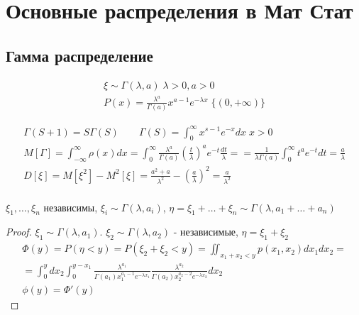 \documentclass{article}
\begin{document}
\section{Основные распределения в Мат Стат}
\subsection{Гамма распределение}
\begin{gather*}
  \xi \sim \Gamma(\lambda,a) \; \lambda>0,a>0 \\
  P(x)=\frac{\lambda^{a}}{\Gamma(a)}x^{a-1}e^{-\lambda x} \; \{(0,+\infty)\}
\end{gather*}

\begin{gather*}
  \Gamma(S+1)=S \Gamma(S) \qquad \Gamma(S)= \int_{0}^{\infty}x^{s-1}e^{-x}dx \; x>0 \\
  M[ \Gamma]=\int_{-\infty}^{\infty} \rho(x)dx= \int_{0}^{\infty}\frac{\lambda^{a}}{ \Gamma(a)}(\frac{t}{\lambda})^{a}e^{-t}\frac{dt}{\lambda}=
  =\frac{1}{\lambda \Gamma(a)}\int_{0}^{\infty}t^{a}e^{-t}dt=\frac{a}{\lambda} \\
  D[\xi]=M[\xi^{2}]-M^{2}[\xi]=\frac{a^2+a}{\lambda^2}-(\frac{a}{\lambda})^2=\frac{a}{\lambda^2} \\
\end{gather*}
\begin{theorem}
$\xi_1,\dots,\xi_n$ независимы, $\xi_i \sim \Gamma(\lambda,a_i)$, $\eta=\xi_1+\dots+\xi_n \sim \Gamma(\lambda,a_1+\dots+a_n)$
\end{theorem}
\begin{proof}
$\xi_1 \sim \Gamma(\lambda,a_1)$. $\xi_2 \sim \Gamma(\lambda,a_2)$ - независимые, $\eta=\xi_1+\xi_2$
\begin{gather*}
\Phi(y)=P(\eta < y)=P(\xi_2+\xi_2<y)=\iint_{x_1+x_2<y}p(x_1,x_2)dx_1dx_2= \\
=\int_{0}^{y}dx_2\int_{0}^{y-x_1}\frac{\lambda^{a_1}}{\Gamma(a_1)x_1^{a_1-1}e^{-\lambda x_1}}\frac{\lambda^{a_2}}{\Gamma(a_2)x_2^{a_2-2}e^{-\lambda x_2}}dx_2 \\
  \phi(y)=\Phi'(y)
\end{gather*}
\end{proof}
\end{document}
